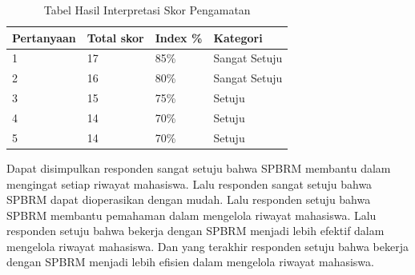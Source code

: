 \begin{table}[H]
\centering
\caption{Tabel Hasil Interpretasi Skor Pengamatan}
\label{hasilinterpretasi}
\begin{tabular}{|l|l|l|l|}
\hline
Pertanyaan & Total skor & Index \% & Kategori\\ \hline
1 & 17 & 85\% & Sangat Setuju\\ \hline
2 & 16 & 80\% & Sangat Setuju\\ \hline
3 & 15 & 75\% & Setuju\\ \hline
4 & 14 & 70\% & Setuju\\ \hline
5 & 14 & 70\% & Setuju\\ \hline
\end{tabular}
\end{table}

Dapat disimpulkan responden sangat setuju bahwa SPBRM membantu dalam mengingat setiap riwayat mahasiswa. Lalu responden sangat setuju bahwa SPBRM dapat dioperasikan dengan mudah. Lalu responden setuju bahwa SPBRM membantu pemahaman dalam mengelola riwayat mahasiswa. Lalu responden setuju bahwa bekerja dengan SPBRM menjadi lebih efektif dalam mengelola riwayat mahasiswa. Dan yang terakhir responden setuju bahwa bekerja dengan SPBRM menjadi lebih efisien dalam mengelola riwayat mahasiswa.